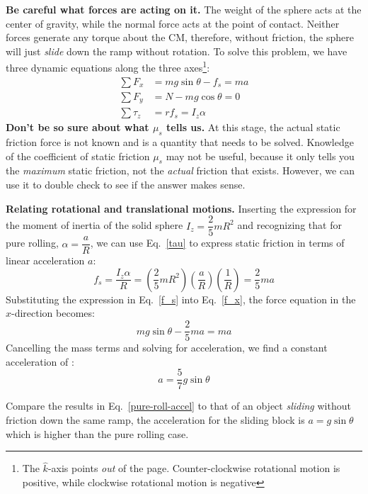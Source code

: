 \documentclass{../../oss-handout}
\newcommand{\kkk}{\hat k}
\begin{document}
\textbf{Be careful what forces are acting on it.} The weight of the sphere acts
at the center of gravity, while the normal force acts at the point of contact.
Neither forces generate any torque about the CM, therefore, without friction,
the sphere will just \emph{slide} down the ramp without rotation. To solve this
problem, we have three dynamic equations along the three
axes\footnote{The $\kkk$-axis points \emph{out} of the page. Counter-clockwise
  rotational motion is positive, while clockwise rotational motion is negative}:
\begin{align}
  \sum F_x&=mg\sin\theta-f_s=ma\\ \label{f_x}
  \sum F_y&=N-mg\cos\theta=0\\
  \sum\tau_z&=rf_s=I_z\alpha \label{tau}
\end{align}
\textbf{Don't be so sure about what $\mu_s$ tells us.} At this stage, the
actual static friction force is not known and is a quantity that needs to be
solved. Knowledge of the coefficient of static friction $\mu_s$ may not be
useful, because it only tells you the \emph{maximum} static friction, not the
\emph{actual} friction that exists. However, we can use it to double check to
see if the answer makes sense.

\textbf{Relating rotational and translational motions.} Inserting the
expression for the moment of inertia of the solid sphere $I_z=\dfrac25 mR^2$
and recognizing that for pure rolling, $\alpha=\dfrac aR$, we can use
Eq.~\ref{tau} to express static friction in terms of linear acceleration $a$:
\begin{equation}
  f_s=\frac{I_z\alpha}{R}=
  \left(\frac25 mR^2\right)
  \left(\frac{a}{R}\right)
  \left(\frac{1}{R}\right)=\frac25ma
  \label{f_s}
\end{equation}
Substituting the expression in Eq.~\ref{f_s} into Eq.~\ref{f_x}, the force
equation in the $x$-direction becomes:
\begin{equation}
  mg\sin\theta-\frac25 ma=ma
\end{equation}
Cancelling the mass terms and solving for acceleration, we find a constant
acceleration of :
\begin{equation}
  a=\frac57 g\sin\theta
  \label{pure-roll-accel}
\end{equation}

Compare the results in Eq.~\ref{pure-roll-accel} to that of an object
\emph{sliding} without friction down the same ramp, the acceleration for the
sliding block is $a=g\sin\theta$ which is higher than the pure rolling case.
\end{document}
